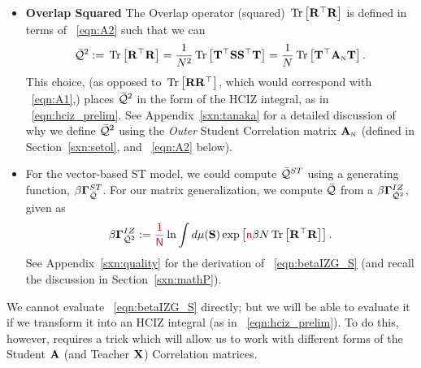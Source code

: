 \begin{itemize}
\item
 \textbf{Overlap Squared}
 The Overlap operator (squared)  $\mbox{}\operatorname{Tr}\left[\mathbf{R}^{\top}\mathbf{R}\right]$ is defined  in terms of \EQN~\ref{eqn:A2} such
 that we can 
\begin{align}
  \label{eqn:TraceR2withA2}
  \bar{\mathcal{Q}}^{2} :=\mbox{}\operatorname{Tr}\left[\mathbf{R}^{\top}\mathbf{R}\right]
  =\frac{1}{N^{2}}\mbox{}\operatorname{Tr}\left[{\mathbf{T}}^{\top}{\mathbf{S}}{\mathbf{S}}^{\top}{\mathbf{T}}\right]
  =\frac{1}{N}\mbox{}\operatorname{Tr}\left[{\mathbf{T}}^{\top}{\mathbf{A}}_{\text{\tiny N}}{\mathbf{T}}\right]  .
\end{align}
This choice, (as opposed to $\mbox{}\operatorname{Tr}\left[\mathbf{R}\mathbf{R}^{\top}\right]$, which would correspond with \EQN~\ref{eqn:A1},) places $\bar{\mathcal{Q}}^{2}$ in the form of the HCIZ integral, as in \EQN~\ref{eqn:hciz_prelim}.
See Appendix~\ref{sxn:tanaka} for a detailed discussion of why we define $\bar{\mathcal{Q}}^{2}$ using the \emph{Outer} Student Correlation matrix ${\mathbf{A}}_{\text{\tiny N}}$ (defined in Section~\ref{sxn:setol}, and  \EQN~\ref{eqn:A2} below).
\item
 \textbf{\GeneratingFunction}
For the vector-based ST model, we could compute $\bar{\mathcal{Q}}^{ST}$ using a generating function, $\beta\mathbf{\Gamma}^{ST}_{\bar{\mathcal{Q}}}$.
For our matrix generalization, we compute $\bar{\mathcal{Q}}$ from a \emph{\LayerQualitySquared \GeneratingFunction} $\beta\mathbf{\Gamma}^{IZ}_{\bar{\mathcal{Q}}^{2}}$, given as
\begin{align}
  \label{eqn:betaIZG_S}
  \beta\mathbf{\Gamma}^{IZ}_{\bar{\mathcal{Q}}^{2}}:=  {\color{red}\sf{\frac{1}{N}}}\ln \int d\mu({\mathbf{S}}) \exp\left[{\color{red}\sf{n}}\beta N\mbox{}\operatorname{Tr}\left[\mathbf{R}^{\top}\mathbf{R}\right]\right] .
\end{align}
See Appendix~\ref{sxn:quality} for the derivation of \EQN~\ref{eqn:betaIZG_S} (and recall the discussion in Section~\ref{sxn:mathP}). 


\end{itemize}
%

We cannot evaluate \EQN~\ref{eqn:betaIZG_S} directly; but we will be able to evaluate it if we transform it into an HCIZ integral (as in \EQN~\ref{eqn:hciz_prelim}). To do this, however, requires a trick which will allow us to work with different forms of the Student $\mathbf{A}$ (and Teacher $\mathbf{X}$) Correlation matrices.



